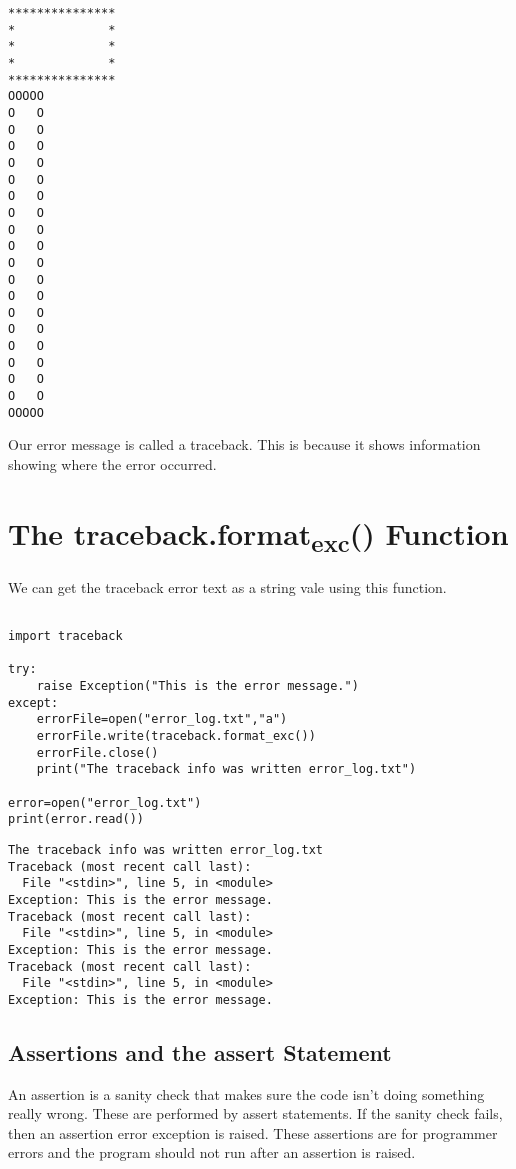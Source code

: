 \documentclass[11pt]{article}
\begin{document}
\begin{verbatim}
***************
*             *
*             *
*             *
***************
OOOOO
O   O
O   O
O   O
O   O
O   O
O   O
O   O
O   O
O   O
O   O
O   O
O   O
O   O
O   O
O   O
O   O
O   O
O   O
OOOOO
\end{verbatim}

Our error message is called a traceback. This is because it shows information showing where the error occurred.

\section{The traceback.format\textsubscript{exc}() Function}
\label{sec:orgd53300c}

We can get the traceback error text as a string vale using this function.


\begin{verbatim}

import traceback

try:
    raise Exception("This is the error message.")
except:
    errorFile=open("error_log.txt","a")
    errorFile.write(traceback.format_exc())
    errorFile.close()
    print("The traceback info was written error_log.txt")

error=open("error_log.txt")
print(error.read())

\end{verbatim}

\begin{verbatim}
The traceback info was written error_log.txt
Traceback (most recent call last):
  File "<stdin>", line 5, in <module>
Exception: This is the error message.
Traceback (most recent call last):
  File "<stdin>", line 5, in <module>
Exception: This is the error message.
Traceback (most recent call last):
  File "<stdin>", line 5, in <module>
Exception: This is the error message.

\end{verbatim}

\subsection{Assertions and the assert Statement}
\label{sec:org48a4baf}

An assertion is a sanity check that makes sure the code isn't doing something really wrong. These are performed by assert statements. If the sanity check fails, then an assertion error exception is raised. These assertions are for programmer errors and the program should not run after an assertion is raised.
\end{document}
